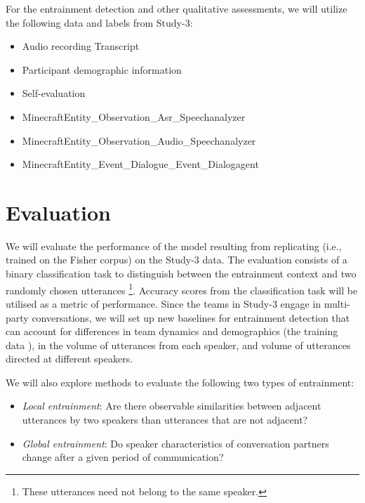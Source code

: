     For the entrainment detection and other qualitative assessments, we will
    utilize the following data and labels from Study-3:

            \begin{itemize}               
                   \item Audio recording
                    Transcript
                   \item Participant demographic information
                   \item Self-evaluation
                   \item MinecraftEntity\_Observation\_Asr\_Speechanalyzer
                   \item MinecraftEntity\_Observation\_Audio\_Speechanalyzer
                   \item MinecraftEntity\_Event\_Dialogue\_Event\_Dialogagent
            \end{itemize}

\section{Evaluation}

We will evaluate the performance of the model resulting from replicating
\citet{nasir2020} (i.e., trained on the Fisher corpus\cite{cieri2004fisher}) on
the Study-3 data. The evaluation consists of a binary classification task to
distinguish between the entrainment context and two randomly chosen utterances
\footnote{These utterances need not belong to the same speaker.}. Accuracy
scores from the classification task will be utilised as a metric of
performance. Since the teams in Study-3 engage in multi-party conversations, we
will set up new baselines for entrainment detection that can account for
differences in team dynamics and demographics (the training data ), in the
volume of utterances from each speaker, and volume of utterances directed at
different speakers.

We will also explore methods to evaluate the following two types of
entrainment:

\begin{itemize}

    \item \emph{Local entrainment}: Are there observable similarities between
        adjacent utterances by two speakers than utterances that are not
        adjacent?

    \item \emph{Global entrainment}: Do speaker characteristics of conversation
        partners change after a given period of communication?

\end{itemize}


